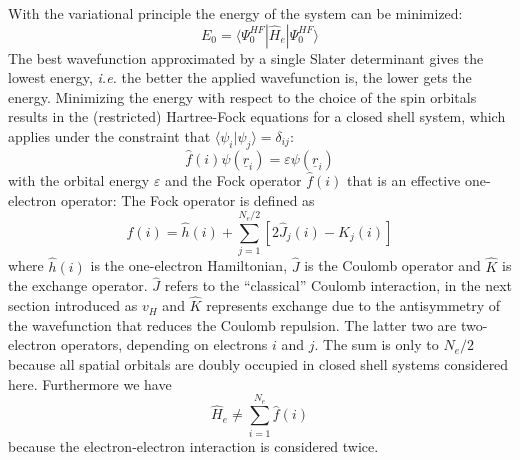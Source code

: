 \documentclass[11pt,DIV=13,BCOR=5mm,a4paper,headinclude]{scrbook}
\renewcommand{\vec}[1]{\underline{#1}}
\begin{document}
With the variational principle the energy of the system can be minimized:
\begin{equation}
E_0=\langle\Psi^{HF}_0|\hat{H}_e|\Psi^{HF}_0\rangle
\end{equation}
The best wavefunction approximated by a single Slater determinant gives the lowest energy, \textit{i.e.} the better the applied wavefunction is, the lower gets the energy.
Minimizing the energy with respect to the choice of the spin orbitals results in the (restricted) Hartree-Fock equations for a closed shell system, which applies under the constraint that $\langle \psi_i|\psi_j\rangle=\delta_{ij}$:
\begin{equation}\label{eq:hf}
\hat{f}(i)\psi(\vec{r}_i)=\varepsilon\psi(\vec{r}_i)
\end{equation}
with the orbital energy $\varepsilon$ and the Fock operator $\hat{f}(i)$ that is an effective one-electron operator:
The Fock operator is defined as
\begin{equation}
 \hat{f}(i) = \hat{h}(i) + \sum_{j=1}^{N_e/2}[2\hat{J}_j(i) - \hat{K}_j(i)]
\end{equation}
where $\hat{h}(i)$ is the one-electron Hamiltonian, $\hat{J}$ is the Coulomb operator and $\hat{K}$ is the exchange operator.
$\hat{J}$ refers to the ``classical'' Coulomb interaction, in the next section introduced as $v_H$ and $\hat{K}$ represents exchange due to the antisymmetry of the wavefunction that reduces the Coulomb repulsion.
The latter two are two-electron operators, depending on electrons $i$ and $j$.
The sum is only to $N_e/2$ because all spatial orbitals are doubly occupied in closed shell systems considered here.
Furthermore we have
\begin{equation}
 \hat{H}_e\neq\sum_{i=1}^{N_e}\hat{f}(i)
\end{equation}
because the electron-electron interaction is considered twice.
\end{document}
